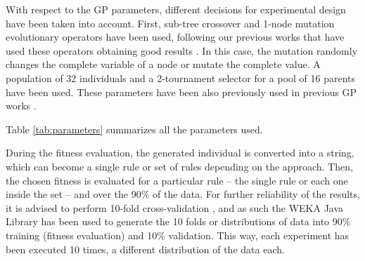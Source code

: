 \documentclass[a4paper,10pt,twocolumn,preprint,3p]{elsarticle}
\begin{document}
With respect to the GP parameters, different decisions for experimental design have been taken into account. 
First, sub-tree crossover and 1-node mutation evolutionary operators have
been used, following our previous works that have used these operators
obtaining good results \cite{EvoStar2014:GPBot}. In this case, the
mutation randomly changes the complete variable of a node or mutate
the complete value. A population of 32 individuals and a 2-tournament selector for a pool of
16 parents have been used. These parameters have been also previously used in previous GP works \cite{EvoStar2014:GPBot}.

Table \ref{tab:parameters} summarizes all the parameters used.

\begin{table}
\begin{center}
\caption{Parameters used in the experiments.}
\label{tab:parameters}
\end{center}
\end{table}

During the fitness evaluation, the generated individual is converted
into a string, which can become a single rule or set of rules
depending on the approach. %
Then, the chosen fitness is evaluated for a particular rule -- the single rule or each one inside the set -- and over the 90\% of the data.
For further reliability of the results, it is advised to perform 10-fold cross-validation \cite{kohavi1995study}, and as such the WEKA Java Library \cite{HallWEKA09} has been used to generate the 10 folds or distributions of data into 90\% training (fitness evaluation) and 10\% validation. This way, each experiment has been executed 10 times, a different distribution of the data each.
\end{document}
